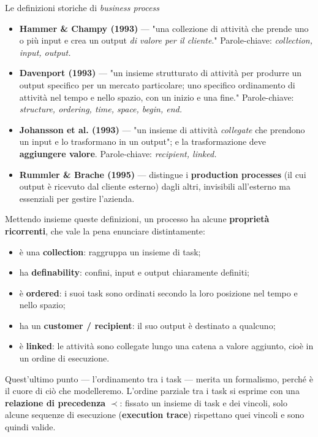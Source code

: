 \begin{boxnote}{Le definizioni storiche di \emph{business process}}
\begin{itemize}
\item \textbf{Hammer \& Champy (1993)} — "una collezione di attività che prende uno o più input e crea un output \emph{di valore per il cliente}." Parole-chiave: \emph{collection, input, output.}
\item \textbf{Davenport (1993)} — "un insieme strutturato di attività per produrre un output specifico per un mercato particolare; uno specifico ordinamento di attività nel tempo e nello spazio, con un inizio e una fine." Parole-chiave: \emph{structure, ordering, time, space, begin, end.}
\item \textbf{Johansson et al. (1993)} — "un insieme di attività \emph{collegate} che prendono un input e lo trasformano in un output"; e la trasformazione deve \textbf{aggiungere valore}. Parole-chiave: \emph{recipient, linked.}
\item \textbf{Rummler \& Brache (1995)} — distingue i \textbf{production processes} (il cui output è ricevuto dal cliente esterno) dagli altri, invisibili all'esterno ma essenziali per gestire l'azienda.
\end{itemize}
\end{boxnote}

Mettendo insieme queste definizioni, un processo ha alcune \textbf{proprietà ricorrenti}, che vale la pena enunciare distintamente:

\begin{itemize}
\item è una \textbf{collection}: raggruppa un insieme di task;
\item ha \textbf{definability}: confini, input e output chiaramente definiti;
\item è \textbf{ordered}: i suoi task sono ordinati secondo la loro posizione nel tempo e nello spazio;
\item ha un \textbf{customer / recipient}: il suo output è destinato a qualcuno;
\item è \textbf{linked}: le attività sono collegate lungo una catena a valore aggiunto, cioè in un ordine di esecuzione.
\end{itemize}

Quest'ultimo punto — l'ordinamento tra i task — merita un formalismo, perché è il cuore di ciò che modelleremo. L'ordine parziale tra i task si esprime con una \textbf{relazione di precedenza} $\prec$: fissato un insieme di task e dei vincoli, solo alcune sequenze di esecuzione (\textbf{execution trace}) rispettano quei vincoli e sono quindi valide.

